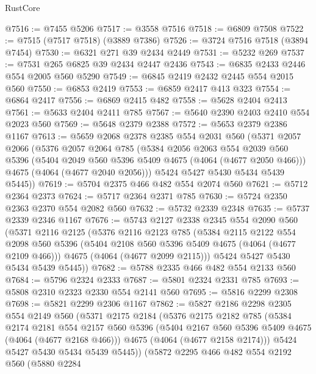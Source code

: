 \begin{lexlean}{RustCore}
\begin{coremodule}
@7516 := @7455 @5206
@7517 := @3558 @7516
@7518 := @6809 @7508
@7522 := @7515 (@7517 @7518) (@3889 @7386)
@7526 := @3724 @7516 @7518 (@3894 @7454)
@7530 := @6321 @271 @39 @2434 @2449
@7531 := @5232 @269
@7537 := @7531 @265 @6825 @39 @2434 @2447 @2436
@7543 := @6835 @2433 @2446 @554 @2005 @560 @5290
@7549 := @6845 @2419 @2432 @2445 @554 @2015 @560
@7550 := @6853 @2419
@7553 := @6859 @2417 @413 @323
@7554 := @6864 @2417
@7556 := @6869 @2415 @482
@7558 := @5628 @2404 @2413
@7561 := @5633 @2404 @2411 @785
@7567 := @5640 @2390 @2403 @2410 @554 @2023 @560
@7569 := @5648 @2379 @2388
@7572 := @5653 @2379 @2386 @1167
@7613 := @5659
    @2068
    @2378
    @2385
    @554
    @2031
    @560
    (@5371
      @2057
      @2066
      (@5376
        @2057
        @2064
        @785
        (@5384
          @2056
          @2063
          @554
          @2039
          @560
          @5396
          (@5404 @2049 @560 @5396 @5409 @4675 (@4064 (@4677 @2050 @466)))
          @4675
          (@4064 (@4677 @2040 @2056)))
        @5424
        @5427
        @5430
        @5434
        @5439
        @5445))
@7619 := @5704 @2375 @466 @482 @554 @2074 @560
@7621 := @5712 @2364 @2373
@7624 := @5717 @2364 @2371 @785
@7630 := @5724 @2350 @2363 @2370 @554 @2082 @560
@7632 := @5732 @2339 @2348
@7635 := @5737 @2339 @2346 @1167
@7676 := @5743
    @2127
    @2338
    @2345
    @554
    @2090
    @560
    (@5371
      @2116
      @2125
      (@5376
        @2116
        @2123
        @785
        (@5384
          @2115
          @2122
          @554
          @2098
          @560
          @5396
          (@5404 @2108 @560 @5396 @5409 @4675 (@4064 (@4677 @2109 @466)))
          @4675
          (@4064 (@4677 @2099 @2115)))
        @5424
        @5427
        @5430
        @5434
        @5439
        @5445))
@7682 := @5788 @2335 @466 @482 @554 @2133 @560
@7684 := @5796 @2324 @2333
@7687 := @5801 @2324 @2331 @785
@7693 := @5808 @2310 @2323 @2330 @554 @2141 @560
@7695 := @5816 @2299 @2308
@7698 := @5821 @2299 @2306 @1167
@7862 := @5827
    @2186
    @2298
    @2305
    @554
    @2149
    @560
    (@5371
      @2175
      @2184
      (@5376
        @2175
        @2182
        @785
        (@5384
          @2174
          @2181
          @554
          @2157
          @560
          @5396
          (@5404 @2167 @560 @5396 @5409 @4675 (@4064 (@4677 @2168 @466)))
          @4675
          (@4064 (@4677 @2158 @2174)))
        @5424
        @5427
        @5430
        @5434
        @5439
        @5445))
    (@5872
      @2295
      @466
      @482
      @554
      @2192
      @560
      (@5880
        @2284

\end{coremodule}
\end{lexlean}
